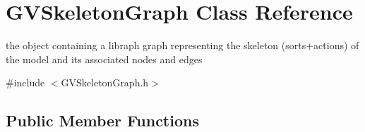 \hypertarget{classGVSkeletonGraph}{\section{G\+V\+Skeleton\+Graph Class Reference}
\label{classGVSkeletonGraph}
}


the object containing a libraph graph representing the skeleton (sorts+actions) of the model and its associated nodes and edges  




{\ttfamily \#include $<$G\+V\+Skeleton\+Graph.\+h$>$}

\subsection*{Public Member Functions}
